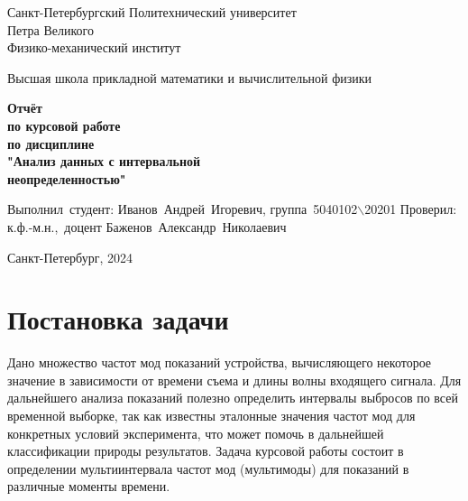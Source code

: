 \documentclass[12pt,a4paper]{article}
\begin{document}
	
	\begin{titlepage}
		
		\begin{center}
			\begin{large}
				Санкт-Петербургский Политехнический университет\\ Петра Великого\\
				Физико-механический институт\\
			\end{large}
			\vspace{0.2cm}
			Высшая школа прикладной математики и вычислительной физики\\
			
		\end{center}
		
		\vspace{3cm}
		\begin{center}
			\textbf{Отчёт\\ по курсовой работе\\ по дисциплине\\ "Анализ данных с интервальной \\неопределенностью"}
		\end{center}
		
		\vspace{3cm}
		
		\vbox{%
			\hfill%
			\vbox{%
				\hbox{Выполнил студент:}%
				\hbox{\break}
				\hbox{Иванов Андрей Игоревич,}%
				\hbox{группа 5040102$\backslash$20201}%
				\hbox{\break}
				\hbox{\break}
				\hbox{Проверил:}
				\hbox{\break}
				\hbox{к.ф.-м.н., доцент}
				\hbox{Баженов Александр Николаевич}
			}%
		} 
		\vfill
		
		\begin{center}
			Санкт-Петербург, 2024
		\end{center}
	
	\end{titlepage}
	\tableofcontents
	\newpage
	
	\listoffigures
	\newpage
	
	\section{Постановка задачи}
            Дано множество частот мод показаний устройства, вычисляющего некоторое значение в зависимости от времени съема и длины волны входящего сигнала. Для дальнейшего анализа показаний полезно определить интервалы выбросов по всей временной выборке, так как известны эталонные значения частот мод для конкретных условий эксперимента, что может помочь в дальнейшей классификации природы результатов. Задача курсовой работы состоит в определении мультиинтервала частот мод (мультимоды) для показаний в различные моменты времени.
	\newpage
	
\end{document}
